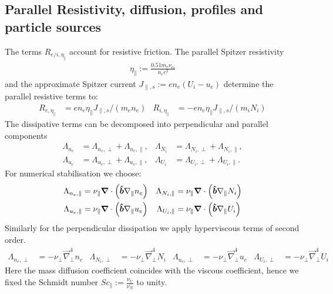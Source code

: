 \subsection{Parallel Resistivity, diffusion, profiles and particle sources}\label{sec:dissres}
The terms $R_{e/i,\eta_\parallel}$ account for resistive friction.
The parallel Spitzer resistivity
\begin{align}
\eta_\parallel := \frac{0.51 m_e \nu_{ei}}{n_e e^2}
\end{align}
and the approximate Spitzer current \(J_{\parallel,s}:= e n_e \left(U_i - u_e\right)\) determine the parallel resistive terms to:
\begin{align}
  R_{e,\eta_\parallel} &=  en_e\eta_\parallel J_{\parallel,s}/(m_en_e)  &
  R_{i,\eta_\parallel} &=- en_e\eta_\parallel J_{\parallel,s}/(m_iN_i)
\end{align}
The dissipative terms can be decomposed into perpendicular and parallel components
\begin{align}
 \Lambda_{n_e} &= \Lambda_{n_e,\perp}+\Lambda_{n_e,\parallel}, &
 \Lambda_{N_i} &= \Lambda_{N_i,\perp}+\Lambda_{N_i,\parallel},\\
 \Lambda_{u_e} &= \Lambda_{u_e,\perp}+\Lambda_{u_e,\parallel},&
 \Lambda_{U_i} &= \Lambda_{U_i,\perp}+\Lambda_{U_i,\parallel}.
\end{align}
For numerical stabilisation we choose:
\begin{align}
\Lambda_{n_e,\parallel} &=  \nu_\parallel{\boldsymbol{\nabla}} \cdot \left(\bm{\hat{b}} \nabla_\parallel n_e\right) &
 \Lambda_{N_i,\parallel} &=  \nu_\parallel{\boldsymbol{\nabla}} \cdot \left(\bm{\hat{b}} \nabla_\parallel N_i\right) \\
  \Lambda_{u_e,\parallel} &= \nu_\parallel {\boldsymbol{\nabla}} \cdot \left(\bm{\hat{b}} \nabla_\parallel u_e\right) &
 \Lambda_{U_i,\parallel} &= \nu_\parallel {\boldsymbol{\nabla}} \cdot \left(\bm{\hat{b}} \nabla_\parallel U_i\right) 
\end{align}
Similarly for the perpendicular dissipation we apply hyperviscous terms of second order.
\begin{align}\label{eq:perpdiffNT}
 \Lambda_{n_e,\perp} &=  -\nu_\perp \vec{\nabla}_\perp^4 n_e &
 \Lambda_{N_i,\perp} &=  -\nu_\perp \vec{\nabla}_\perp^4 N_i &
 \Lambda_{u_e,\perp} &=  -\nu_\perp \vec{\nabla}_\perp^4 u_e &
 \Lambda_{U_i,\perp} &=  -\nu_\perp \vec{\nabla}_\perp^4 U_i
\end{align}
Here the mass diffusion coefficient coincides with the viscous coefficient, hence we fixed the Schmidt number \(\mathit{Sc}_\parallel:= \frac{\nu_U}{\nu_N}\) to unity.

